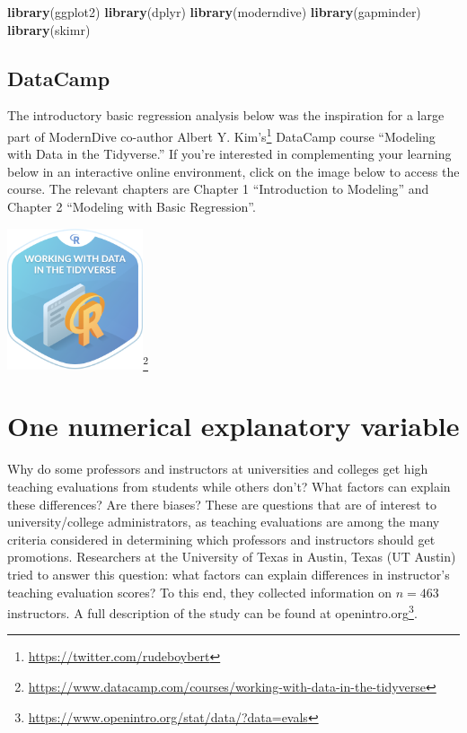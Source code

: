 \documentclass[12pt,]{krantz}
\makeatletter
\newenvironment{Shaded}{\begin{snugshade}}{\end{snugshade}}
\newcommand{\KeywordTok}[1]{\textcolor[rgb]{0.27,0.27,0.27}{\textbf{#1}}}
\newcommand{\NormalTok}[1]{#1}
\renewcommand{\href}[2]{#2\footnote{\url{#1}}}
\newenvironment{kframe}{%
\medskip{}
\setlength{\fboxsep}{.8em}
 \def\at@end@of@kframe{}%
 \ifinner\ifhmode%
  \def\at@end@of@kframe{\end{minipage}}%
  \begin{minipage}{\columnwidth}%
 \fi\fi%
 \def\FrameCommand##1{\hskip\@totalleftmargin \hskip-\fboxsep
 \colorbox{shadecolor}{##1}\hskip-\fboxsep
     \hskip-\linewidth \hskip-\@totalleftmargin \hskip\columnwidth}%
 \MakeFramed {\advance\hsize-\width
   \@totalleftmargin\z@ \linewidth\hsize
   \@setminipage}}%
 {\par\unskip\endMakeFramed%
 \at@end@of@kframe}
\renewenvironment{Shaded}{\begin{kframe}}{\end{kframe}}
\makeatother
\begin{document}
\begin{Shaded}
\begin{Highlighting}[]
\KeywordTok{library}\NormalTok{(ggplot2)}
\KeywordTok{library}\NormalTok{(dplyr)}
\KeywordTok{library}\NormalTok{(moderndive)}
\KeywordTok{library}\NormalTok{(gapminder)}
\KeywordTok{library}\NormalTok{(skimr)}
\end{Highlighting}
\end{Shaded}

\subsection*{DataCamp}\label{datacamp-3}


The introductory basic regression analysis below was the inspiration for
a large part of ModernDive co-author
\href{https://twitter.com/rudeboybert}{Albert Y. Kim's} DataCamp course
``Modeling with Data in the Tidyverse.'' If you're interested in
complementing your learning below in an interactive online environment,
click on the image below to access the course. The relevant chapters are
Chapter 1 ``Introduction to Modeling'' and Chapter 2 ``Modeling with
Basic Regression''.

\begin{center}
\href{https://www.datacamp.com/courses/working-with-data-in-the-tidyverse}{\includegraphics[width=0.3\textwidth]{images/datacamp_working_with_data.png}}
\end{center}

\section{One numerical explanatory variable}\label{model1}

Why do some professors and instructors at universities and colleges get
high teaching evaluations from students while others don't? What factors
can explain these differences? Are there biases? These are questions
that are of interest to university/college administrators, as teaching
evaluations are among the many criteria considered in determining which
professors and instructors should get promotions. Researchers at the
University of Texas in Austin, Texas (UT Austin) tried to answer this
question: what factors can explain differences in instructor's teaching
evaluation scores? To this end, they collected information on
\(n = 463\) instructors. A full description of the study can be found at
\href{https://www.openintro.org/stat/data/?data=evals}{openintro.org}.
\end{document}
